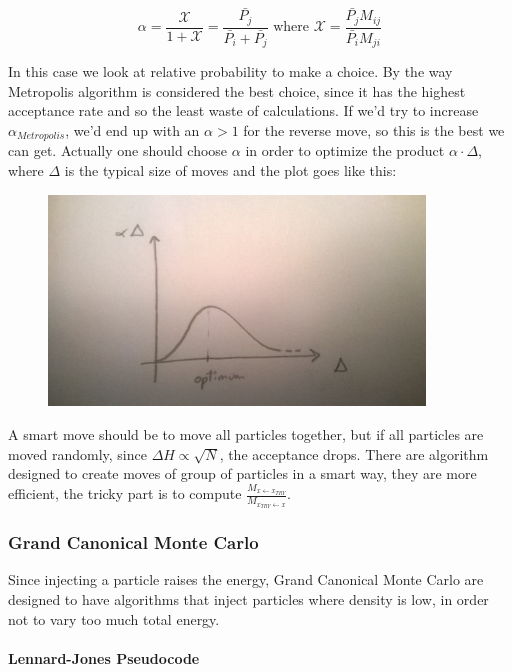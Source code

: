\documentclass[a4paper, italian, openany]{book}
\begin{document}
$$\alpha = \frac{\mathcal{X}}{1+\mathcal{X}} = \frac{\bar{P_j}}{\bar{P_i}+\bar{P_j}} \mbox{ where } \mathcal{X}=\frac{\bar{P_j} M_{ij}}{\bar{P_i} M_{ji}}$$

In this case we look at relative probability to make a choice. By the way Metropolis algorithm is considered the best choice, since it has the highest acceptance rate and so the least waste of calculations. If we'd try to increase $\alpha_{Metropolis}$, we'd end up with an $\alpha > 1$ for the reverse move, so this is the best we can get.\newline
Actually one should choose $\alpha$ in order to optimize the product $\alpha \cdot \Delta$, where $\Delta$ is the typical size of moves and the plot goes like this:

\begin{figure}[H]
\centering
\includegraphics[width=100mm]{img/pic18.jpg}
\end{figure}

A smart move should be to move all particles together, but if all particles are moved randomly, since $\Delta H \propto \sqrt{N}$, the acceptance drops. There are algorithm designed to create moves of group of particles in a smart way, they are more efficient, the tricky part is to compute $\frac{M_{x \leftarrow x_{TRY}}}{M_{x_{TRY}\leftarrow x}}$.

\subsubsection{Grand Canonical Monte Carlo}

Since injecting a particle raises the energy, Grand Canonical Monte Carlo are designed to have algorithms that inject particles where density is low, in order not to vary too much total energy.

\paragraph{Lennard-Jones Pseudocode}
\end{document}
